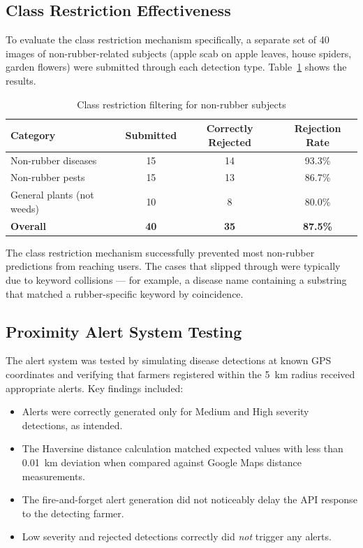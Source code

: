 \subsection{Class Restriction Effectiveness}

To evaluate the class restriction mechanism specifically, a separate set of 40 images of non-rubber-related subjects (apple scab on apple leaves, house spiders, garden flowers) were submitted through each detection type. Table~\ref{tab:class_restriction} shows the results.

\begin{table}[H]
\centering
\caption{Class restriction filtering for non-rubber subjects}
\label{tab:class_restriction}
\begin{tabular}{|l|c|c|c|}
\hline
\textbf{Category} & \textbf{Submitted} & \textbf{Correctly Rejected} & \textbf{Rejection Rate} \\
\hline
Non-rubber diseases & 15 & 14 & 93.3\% \\
\hline
Non-rubber pests & 15 & 13 & 86.7\% \\
\hline
General plants (not weeds) & 10 & 8 & 80.0\% \\
\hline
\textbf{Overall} & \textbf{40} & \textbf{35} & \textbf{87.5\%} \\
\hline
\end{tabular}
\end{table}

The class restriction mechanism successfully prevented most non-rubber predictions from reaching users. The cases that slipped through were typically due to keyword collisions --- for example, a disease name containing a substring that matched a rubber-specific keyword by coincidence.

\subsection{Proximity Alert System Testing}

The alert system was tested by simulating disease detections at known GPS coordinates and verifying that farmers registered within the 5~km radius received appropriate alerts. Key findings included:

\begin{itemize}
    \item Alerts were correctly generated only for Medium and High severity detections, as intended.
    \item The Haversine distance calculation matched expected values with less than 0.01~km deviation when compared against Google Maps distance measurements.
    \item The fire-and-forget alert generation did not noticeably delay the API response to the detecting farmer.
    \item Low severity and rejected detections correctly did \textit{not} trigger any alerts.
\end{itemize}


